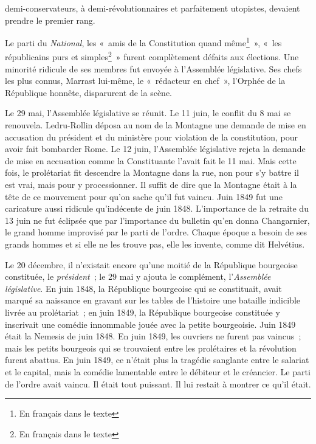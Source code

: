 \documentclass[twoside]{book} %
\newcommand\chapteropen{} %
\newcommand\chapterclose{} %
\begin{document}
demi-conservateurs, à demi-révolutionnaires et parfaitement utopistes, devaient prendre le premier rang.\par
Le parti du \emph{National}, les « amis de la Constitution quand même\footnote{En français dans le texte} », « les républicains purs et simples\footnote{En français dans le texte} » furent complètement défaits aux élections. Une minorité ridicule de ses membres fut envoyée à l’Assemblée législative. Ses chefs les plus connus, Marrast lui-même, le « rédacteur en chef », l’Orphée de la République honnête, disparurent de la scène.\par
Le 29 mai, l’Assemblée législative se réunit. Le 11 juin, le conflit du 8 mai se renouvela. Ledru-Rollin déposa au nom de la Montagne une demande de mise en accusation du président et du ministère pour violation de la constitution, pour avoir fait bombarder Rome. Le 12 juin, l’Assemblée législative rejeta la demande de mise en accusation comme la Constituante l’avait fait le 11 mai. Mais cette fois, le prolétariat fit descendre la Montagne dans la rue, non pour s’y battre il est vrai, mais pour y processionner. Il suffit de dire que la Montagne était à la tête de ce mouvement pour qu’on sache qu’il fut vaincu. Juin 1849 fut une caricature aussi ridicule qu’indécente de juin 1848. L’importance de la retraite du 13 juin ne fut éclipsée que par l’importance du bulletin qu’en donna Changarnier, le grand homme improvisé par le parti de l’ordre. Chaque époque a besoin de ses grands hommes et si elle ne les trouve pas, elle les invente, comme dit Helvétius.\par
Le 20 décembre, il n’existait encore qu’une moitié de la République bourgeoise constituée, le \emph{président} ; le 29 mai y ajouta le complément, l’\emph{Assemblée législative}. En juin 1848, la République bourgeoise qui se constituait, avait marqué sa naissance en gravant sur les tables de l’histoire une bataille indicible livrée au prolétariat ; en juin 1849, la République bourgeoise constituée y inscrivait une comédie innommable jouée avec la petite bourgeoisie. Juin 1849 était la Nemesis de juin 1848. En juin 1849, les ouvriers ne furent pas vaincus ; mais les petits bourgeois qui se trouvaient entre les prolétaires et la révolution furent abattus. En juin 1849, ce n’était plus la tragédie sanglante entre le salariat et le capital, mais la comédie lamentable entre le débiteur et le créancier. Le parti de l’ordre avait vaincu. Il était tout puissant. Il lui restait à montrer ce qu’il était.
\chapterclose


\chapteropen
\end{document}
